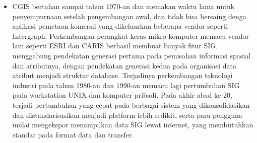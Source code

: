 \begin{itemize}
	\item CGIS bertahan sampai tahun 1970-an dan memakan waktu lama untuk penyempurnaan setelah pengembangan awal, dan tidak bisa bersaing denga aplikasi pemetaan komersil yang dikeluarkan beberapa vendor seperti Intergraph. Perkembangan perangkat keras mikro komputer memacu vendor lain seperti ESRI dan CARIS berhasil membuat banyak fitur SIG, menggabung pendekatan generasi pertama pada pemisahan informasi spasial dan atributnya, dengan pendekatan generasi kedua pada organisasi data atribut menjadi struktur database. Terjadinya perkembangan teknologi industri pada tahun 1980-an dan 1990-an memacu lagi pertumbuhan SIG pada workstation UNIX dan komputer pribadi. Pada akhir abad ke-20,  terjadi pertumbuhan yang cepat pada berbagai sistem yang dikonsolidasikan dan distandarisasikan menjadi platform lebih sedikit, serta para pengguna mulai mengekspor menampilkan data SIG lewat internet, yang membutuhkan standar pada format data dan transfer.
\end{itemize}
